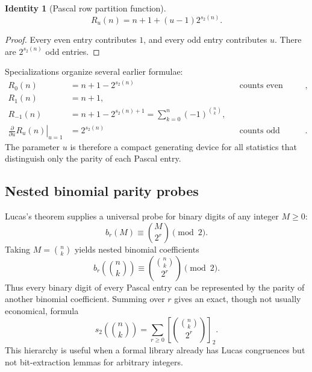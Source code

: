 \documentclass[11pt,oneside]{article}
\newtheorem{identity}[theorem]{Identity}
\theoremstyle{definition}
\theoremstyle{remark}
\newcommand{\bitsum}{s_2}
\begin{document}
\begin{identity}[Pascal row partition function]\label{p3:id:Ru}
\begin{equation}\label{p3:eq:Ru}
 R_u(n)=n+1+(u-1)2^{\bitsum(n)}.
\end{equation}
\end{identity}

\begin{proof}
Every even entry contributes $1$, and every odd entry contributes $u$.
There are $2^{\bitsum(n)}$ odd entries.
\end{proof}

Specializations organize several earlier formulae:
\begin{align*}
 R_0(n)&=n+1-2^{\bitsum(n)} &&\text{counts even entries},\\
 R_1(n)&=n+1,\\
 R_{-1}(n)&=n+1-2^{\bitsum(n)+1}
           =\sum_{k=0}^{n}(-1)^{\binom nk},\\
 \left.\frac{\partial}{\partial u}R_u(n)\right|_{u=1}
 &=2^{\bitsum(n)} &&\text{counts odd entries}.
\end{align*}
The parameter $u$ is therefore a compact generating device for all statistics
that distinguish only the parity of each Pascal entry.

\subsection{Nested binomial parity probes}

Lucas's theorem supplies a universal probe for binary digits of any integer
$M\ge0$:
\begin{equation}\label{p3:eq:nested-bit-probe}
 b_r(M)\equiv\binom{M}{2^r}\pmod2.
\end{equation}
Taking $M=\binom nk$ yields nested binomial coefficients
\begin{equation}\label{p3:eq:nested-pascal-probe}
 b_r\!\left(\binom nk\right)
 \equiv
 \binom{\binom nk}{2^r}\pmod2.
\end{equation}
Thus every binary digit of every Pascal entry can be represented by the parity
of another binomial coefficient.  Summing over $r$ gives an exact, though not
usually economical, formula
\begin{equation}\label{p3:eq:nested-digit-sum}
 \bitsum\!\left(\binom nk\right)
 =\sum_{r\ge0}
   \left[\binom{\binom nk}{2^r}\right]_2.
\end{equation}
This hierarchy is useful when a formal library already has Lucas congruences
but not bit-extraction lemmas for arbitrary integers.
\end{document}
